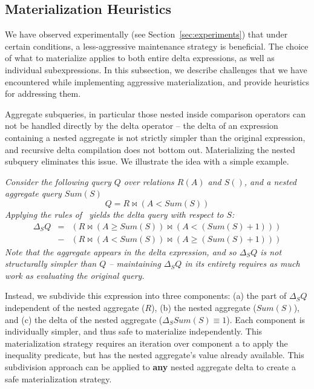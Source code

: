 \subsection{Materialization Heuristics}
\label{sec:advanced-rewriting}

We have observed experimentally (see Section~\ref{sec:experiments}) that under certain conditions, a less-aggressive maintenance strategy is beneficial.  The choice of what to materialize applies to both entire delta expressions, as well as individual subexpressions.  In this subsection, we describe challenges that we have encountered while implementing aggressive materialization, and provide heuristics for addressing them.

Aggregate subqueries, in particular those nested inside comparison operators can not be handled directly by the delta operator -- the delta of an expression containing a nested aggregate is not strictly simpler than the original expression, and recursive delta compilation does not bottom out.  Materializing the nested subquery eliminates this issue.  We illustrate the idea with a simple example.

\begin{example} \em
Consider the following query $Q$ over relations $R(A)$ and $S()$, and a nested aggregate query $Sum(S)$
\vspace*{-0.05in}
{\small $$Q = R \bowtie (A < Sum(S))$$}
Applying the rules of~\cite{koch-pods:10} yields the delta query with respect to $S$:
{\small \begin{eqnarray*}
\Delta_SQ & =  & (R \bowtie (A \geq Sum(S)) \bowtie (A < (Sum(S) +1)))\\
&-& (R \bowtie (A <  Sum(S)) \bowtie (A \geq (Sum(S) + 1)))
\end{eqnarray*}}
Note that the aggregate appears in the delta expression, and so $\Delta_SQ$ is not structurally simpler than $Q$ -- maintaining $\Delta_S Q$ in its entirety requires as much work as evaluating the original query.  

Instead, we subdivide this expression into three components: (a) the part of $\Delta_S Q$ independent of the nested aggregate ($R$), (b) the nested aggregate ($Sum(S)$), and (c) the delta of the nested aggregate ($\Delta_SSum(S) \equiv 1$).  Each component is individually simpler, and thus safe to materialize independently.  This materialization strategy requires an iteration over component a to apply the inequality predicate, but has the nested aggregate's value already available.  This subdivision approach can be applied to {\bf any} nested aggregate delta to create a safe materialization strategy.
\end{example}

